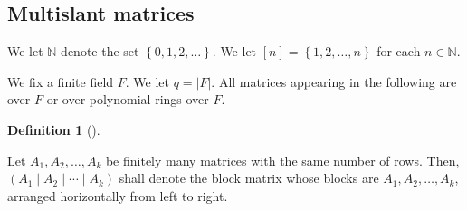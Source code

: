 \documentclass[numbers=enddot,12pt,final,onecolumn,notitlepage]{scrartcl}%
\theoremstyle{definition}
\newtheorem{defi}[theo]{Definition}
\newenvironment{definition}[1][]
{\begin{defi}[#1]\begin{leftbar}}
{\end{leftbar}\end{defi}}
\newenvironment{noncompile}{}{}
\theoremstyle{plainsl}
\begin{document}
\subsection{Multislant matrices}

We let $\mathbb{N}$ denote the set $\left\{  0,1,2,\ldots\right\}  $. We let
$\left[  n\right]  =\left\{  1,2,\ldots,n\right\}  $ for each $n\in\mathbb{N}$.

We fix a finite field $F$. We let $q=\left\vert F\right\vert $. All matrices
appearing in the following are over $F$ or over polynomial rings over $F$.



\begin{definition}
Let $A_{1},A_{2},\ldots,A_{k}$ be finitely many matrices with the same number
of rows. Then, $\left(  A_{1}\mid A_{2}\mid\cdots\mid A_{k}\right)  $ shall
denote the block matrix whose blocks are $A_{1},A_{2},\ldots,A_{k}$, arranged
horizontally from left to right.
\end{definition}
\end{document}
